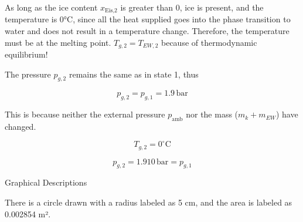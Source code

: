 As long as the ice content \( x_{\text{Eis,2}} \) is greater than 0, ice is present, and the temperature is 0°C, since all the heat supplied goes into the phase transition to water and does not result in a temperature change. Therefore, the temperature must be at the melting point. \( T_{g,2} = T_{EW,2} \) because of thermodynamic equilibrium!

The pressure \( p_{g,2} \) remains the same as in state 1, thus

\[
p_{g,2} = p_{g,1} = 1.9 \, \text{bar}
\]

This is because neither the external pressure \( p_{\text{amb}} \) nor the mass (\( m_k + m_{EW} \)) have changed.

\[
T_{g,2} = 0^\circ \text{C}
\]

\[
p_{g,2} = 1.910 \, \text{bar} = p_{g,1}
\]

Graphical Descriptions

There is a circle drawn with a radius labeled as 5 cm, and the area is labeled as 0.002854 m².